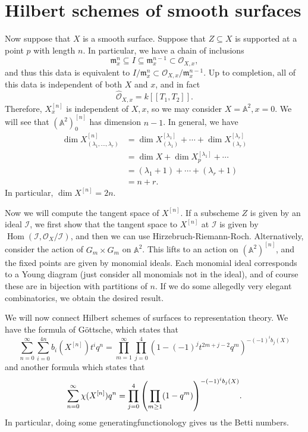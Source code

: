 \documentclass[leqno, openany]{memoir}
\theoremstyle{definition}
\theoremstyle{remark}
\theoremstyle{plain}
\theoremstyle{definition}
\theoremstyle{remark}
\newcommand{\A}{\mathbb{A}}
\newcommand{\mc}[1]{\mathcal{#1}}
\newcommand{\mf}[1]{\mathfrak{#1}}
\newcommand{\wh}[1]{\widehat{#1}}
\DeclareMathOperator{\Hom}{Hom}
\begin{document}
\section{Hilbert schemes of smooth surfaces}%
\label{sec:hilbert_schemes_of_smooth_surfaces}

Now suppose that $X$ is a smooth surface. Suppose that $Z \subseteq X$ is supported at a point $p$ with length $n$. In particular, we have a chain of inclusions
\[ \mf{m}_x^n \subseteq I \subseteq \mf{m}_x^{n-1} \subset \mc{O}_{X,x}, \]
and thus this data is equivalent to $I / \mf{m}_x^n \subset \mc{O}_{X,x} / \mf{m}_x^{n-1}$. Up to completion, all of this data is independent of both $X$ and $x$, and in fact
\[ \wh{\mc{O}}_{X,x} = k[[T_1, T_2]]. \]
Therefore, $X_x^{[n]}$ is independent of $X,x$, so we may consider $X = \A^2, x = 0$. We will see that ${(\A^2)}_0^{[n]}$ has dimension $n-1$. In general, we have
\begin{align*} 
    \dim X_{(\lambda_1, \ldots, \lambda_r)}^{[n]} &= \dim X_{(\lambda_1)}^{[\lambda_1]} + \cdots + \dim X_{(\lambda_r)}^{[\lambda_r]} \\
    &= \dim X + \dim X_p^{[\lambda_1]} + \cdots \\
    &= (\lambda_1 + 1) + \cdots + (\lambda_r + 1) \\
    &= n + r.
\end{align*}
In particular, $\dim X^{[n]} = 2n$.

Now we will compute the tangent space of $X^{[n]}$. If a subscheme $Z$ is given by an ideal $\mc{I}$, we first show that the tangent space to $X^{[n]}$ at $\mc{I}$ is given by $\Hom(\mc{I}, \mc{O}_X/\mc{I})$, and then we can use Hirzebruch-Riemann-Roch. Alternatively, consider the action of $G_m \times G_m$ on $\A^2$. This lifts to an action on ${(\A^2)}^{[n]}$, and the fixed points are given by monomial ideals. Each monomial ideal corresponds to a Young diagram (just consider all monomials not in the ideal), and of course these are in bijection with partitions of $n$. If we do some allegedly very elegant combinatorics, we obtain the desired result.

We will now connect Hilbert schemes of surfaces to representation theory. We have the formula of G\"ottsche, which states that
\[ \sum_{n = 0}^{\infty} \sum_{i=0}^{4n} b_i(X^{[n]}) t^i q^n = \prod_{m=1}^{\infty} \prod_{j=0}^4 {(1- {(-1)}^j t^{2m+j-2} q^m)}^{-{(-1)}^i b_j(X)} \]
and another formula which states that
\[ \sum_{n=0}^{\infty} \chi(X^{[n]}) q^n = \prod_{j=0}^4 {\qty(\prod_{m \geq 1} (1-q^m))}^{-{(-1)}^i b_j(X)}. \]
In particular, doing some generatingfunctionology gives us the Betti numbers.
\end{document}
